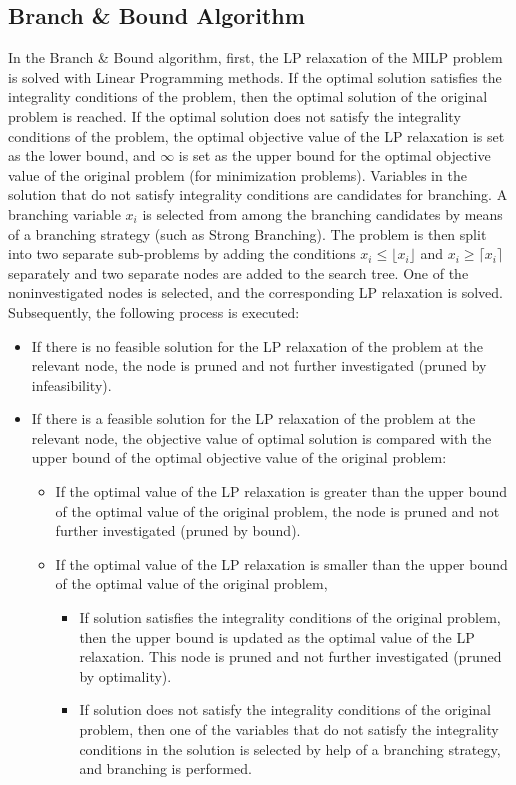 \subsection{Branch \& Bound Algorithm}\label{subsec:branch-bound-algorithm}
In the Branch \& Bound algorithm, first, the LP relaxation of the MILP problem is solved with Linear Programming methods.
If the optimal solution satisfies the integrality conditions of the problem, then the optimal solution of the original problem is reached.
If the optimal solution does not satisfy the integrality conditions of the problem, the optimal objective value of the LP relaxation is set as the lower bound, and $\infty$ is set as the upper bound for the optimal objective value of the original problem (for minimization problems).
Variables in the solution that do not satisfy integrality conditions are candidates for branching.
A branching variable $x_i$ is selected from among the branching candidates by means of a branching strategy (such as Strong Branching).
The problem is then split into two separate sub-problems by adding the conditions $x_i \leq \lfloor x_i \rfloor$ and $x_i \geq \lceil x_i \rceil$ separately and two separate nodes are added to the search tree.
One of the noninvestigated nodes is selected, and the corresponding LP relaxation is solved.
Subsequently, the following process is executed:

\begin{itemize}
  \item If there is no feasible solution for the LP relaxation of the problem at the relevant node, the node is pruned and not further investigated (pruned by infeasibility).
  \item If there is a feasible solution for the LP relaxation of the problem at the relevant node, the objective value of optimal solution is compared with the upper bound of the optimal objective value of the original problem:
  \begin{itemize}
    \item If the optimal value of the LP relaxation is greater than the upper bound of the optimal value of the original problem, the node is pruned and not further investigated (pruned by bound).
    \item If the optimal value of the LP relaxation is smaller than the upper bound of the optimal value of the original problem,
      \begin{itemize}
          \item If solution satisfies the integrality conditions of the original problem, then the upper bound is updated as the optimal value of the LP relaxation.
          This node is pruned and not further investigated (pruned by optimality).
          \item If solution does not satisfy the integrality conditions of the original problem, then one of the variables that do not satisfy the integrality conditions in the solution is selected by help of a branching strategy, and branching is performed.
          \end{itemize}
  \end{itemize}
\end{itemize}

